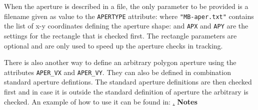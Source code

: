 When the aperture is described in a file, the only parameter to be provided is 
a filename given as value to the \texttt{APERTYPE} attribute:
where \texttt{"MB-aper.txt"} contains the list of x-y coordinates defining the
aperture shape:
and \texttt{APX} and \texttt{APY} are the settings for the rectangle 
that is checked first. The rectangle parameters are optional and are 
only used to speed up the aperture checks in tracking.

There is also another way to define an arbitrary polygon aperture using 
the attributes \texttt{APER_VX} and \texttt{APER_VY}. They can also be
defined in combination standard aperture defintions. The standard
aperture definitions are then checked first and in case it is outside
the standard definition of aperture the arbitrary is checked. An example
of how to use it can be found in: 
\href{https://github.com/MethodicalAcceleratorDesign/MAD-X/blob/master/tests/test-track-13/test-track-13.madx}. 
\textbf{Notes}

